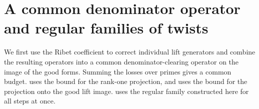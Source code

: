 \section{A common denominator operator and regular families of twists}
\label{sec:c-denominator}

We first use the Ribet coefficient to correct individual lift generators and combine the resulting operators into a common denominator-clearing operator on the image of the good forms. Summing the losses over primes gives a common budget.  uses the bound for the rank-one projection, and  uses the bound for the projection onto the good lift image.  uses the regular family constructed here for all steps at once.

